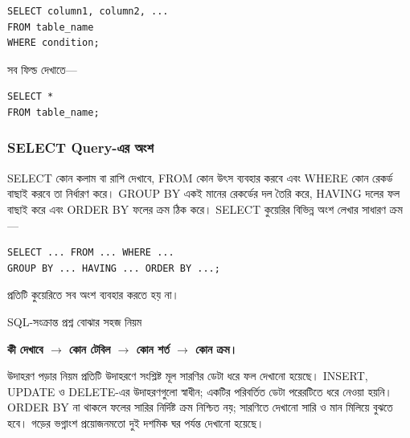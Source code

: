 \par\noindent\begin{minipage}{\linewidth}
\begin{verbatim}
SELECT column1, column2, ...
FROM table_name
WHERE condition;
\end{verbatim}
\end{minipage}\par

সব ফিল্ড দেখাতে—

\par\noindent\begin{minipage}{\linewidth}
\begin{verbatim}
SELECT *
FROM table_name;
\end{verbatim}
\end{minipage}\par

\subsubsection{SELECT Query-এর অংশ}
SELECT কোন কলাম বা রাশি দেখাবে, FROM কোন উৎস ব্যবহার করবে এবং WHERE কোন রেকর্ড বাছাই করবে তা নির্ধারণ করে। GROUP BY একই মানের রেকর্ডের দল তৈরি করে, HAVING দলের ফল বাছাই করে এবং ORDER BY ফলের ক্রম ঠিক করে।
SELECT কুয়েরির বিভিন্ন অংশ লেখার সাধারণ ক্রম—

\par\noindent\begin{minipage}{\linewidth}
\begin{verbatim}
SELECT ... FROM ... WHERE ...
GROUP BY ... HAVING ... ORDER BY ...;
\end{verbatim}
\end{minipage}\par

প্রতিটি কুয়েরিতে সব অংশ ব্যবহার করতে হয় না।

\begin{keypointbox}{SQL-সংক্রান্ত প্রশ্ন বোঝার সহজ নিয়ম}

\noindent\textbf{কী দেখাবে $\rightarrow$ কোন টেবিল $\rightarrow$ কোন শর্ত $\rightarrow$ কোন ক্রম।}

\end{keypointbox}

\begin{keypointbox}{উদাহরণ পড়ার নিয়ম}
প্রতিটি উদাহরণে সংশ্লিষ্ট মূল সারণির ডেটা ধরে ফল দেখানো হয়েছে। INSERT, UPDATE ও DELETE-এর উদাহরণগুলো স্বাধীন; একটির পরিবর্তিত ডেটা পরেরটিতে ধরে নেওয়া হয়নি। ORDER BY না থাকলে ফলের সারির নির্দিষ্ট ক্রম নিশ্চিত নয়; সারণিতে দেখানো সারি ও মান মিলিয়ে বুঝতে হবে। গড়ের ভগ্নাংশ প্রয়োজনমতো দুই দশমিক ঘর পর্যন্ত দেখানো হয়েছে।
\end{keypointbox}
